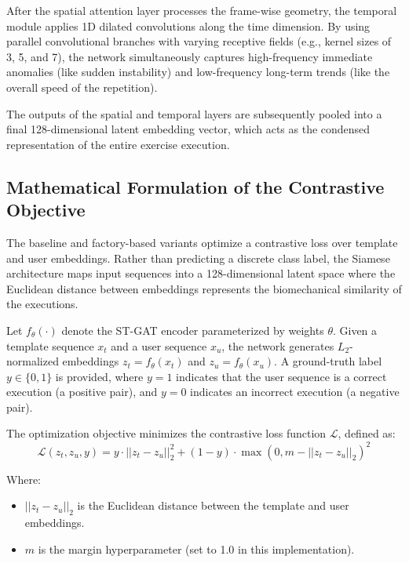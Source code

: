 After the spatial attention layer processes the frame-wise geometry, the temporal module applies 1D dilated convolutions along the time dimension. By using parallel convolutional branches with varying receptive fields (e.g., kernel sizes of 3, 5, and 7), the network simultaneously captures high-frequency immediate anomalies (like sudden instability) and low-frequency long-term trends (like the overall speed of the repetition).

The outputs of the spatial and temporal layers are subsequently pooled into a final 128-dimensional latent embedding vector, which acts as the condensed representation of the entire exercise execution.

\subsection{Mathematical Formulation of the Contrastive Objective}
The baseline and factory-based variants optimize a contrastive loss over template and user embeddings. Rather than predicting a discrete class label, the Siamese architecture maps input sequences into a 128-dimensional latent space where the Euclidean distance between embeddings represents the biomechanical similarity of the executions.

Let $f_{\theta}(\cdot)$ denote the ST-GAT encoder parameterized by weights $\theta$. Given a template sequence $x_t$ and a user sequence $x_u$, the network generates $L_2$-normalized embeddings $z_t = f_{\theta}(x_t)$ and $z_u = f_{\theta}(x_u)$. A ground-truth label $y \in \{0, 1\}$ is provided, where $y = 1$ indicates that the user sequence is a correct execution (a positive pair), and $y = 0$ indicates an incorrect execution (a negative pair).

The optimization objective minimizes the contrastive loss function $\mathcal{L}$, defined as:
\begin{equation}
\mathcal{L}(z_t, z_u, y) = y \cdot ||z_t - z_u||_2^2 + (1 - y) \cdot \max(0, m - ||z_t - z_u||_2)^2
\end{equation}

Where:
\begin{itemize}
    \item $||z_t - z_u||_2$ is the Euclidean distance between the template and user embeddings.
    \item $m$ is the margin hyperparameter (set to 1.0 in this implementation).
\end{itemize}

